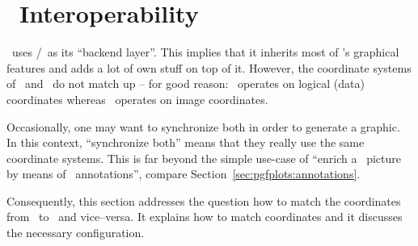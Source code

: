 \section{\tikzname\ Interoperability}
\label{pgfplots:tikz:interoperability}

\PGFPlots\ uses \Tikz/\pgfname\ as its ``backend layer''. This implies that it inherits most of \Tikz's graphical features and adds a lot of own stuff on top of it. However, the coordinate systems of \Tikz\ and \PGFPlots\ do not match up -- for good reason: \PGFPlots\ operates on logical (data) coordinates whereas \Tikz\ operates on image coordinates. 

Occasionally, one may want to synchronize both in order to generate a graphic. In this context, ``synchronize both'' means that they really use the same coordinate systems. This is far beyond the simple use-case of ``enrich a \PGFPlots\ picture by means of \Tikz\ annotations'', compare Section~\ref{sec:pgfplots:annotations}. 

Consequently, this section addresses the question how to match the coordinates from \Tikz\ to \PGFPlots\ and vice--versa. It explains how to match coordinates and it discusses the necessary configuration.


